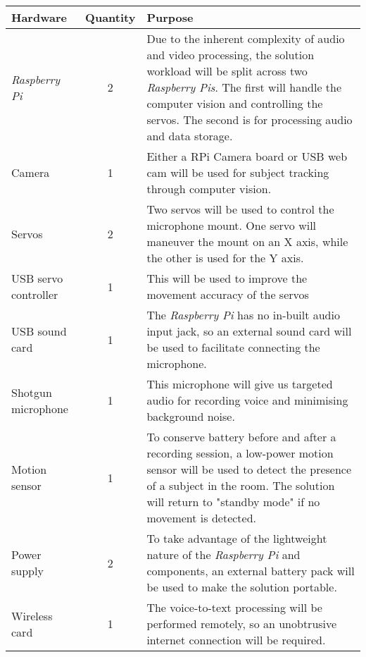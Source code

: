 \documentclass[11pt,a4paper,titlepage]{report}
\newcommand{\rpi}{\textit{Raspberry Pi\textsuperscript{\textregistered}}}
\newcommand{\rpis}{\textit{Raspberry Pi\textsuperscript{\textregistered}s}}
\begin{document}
\begin{center}
\begin{tabular}{ |l|c|p{6cm}| }
    \hline
    
    Hardware & Quantity & Purpose \\ \hline
    
    \rpi & 2 & Due to the inherent complexity of audio and video processing, the solution workload will be split across two \rpis. The first will handle the computer vision and controlling the servos. The second is for processing audio and data storage.\\ \hline

    Camera & 1 & Either a RPi Camera board or USB web cam will be used for subject tracking through computer vision. \\ \hline
    
    Servos & 2 & Two servos will be used to control the microphone mount. One servo will maneuver the mount on an X axis, while the other is used for the Y axis. \\ \hline
        
    USB servo controller & 1 & This will be used to improve the movement accuracy of the servos \\ \hline
    
    USB sound card & 1 & The \rpi\xspace has no in-built audio input jack, so an external sound card will be used to facilitate connecting the microphone. \\ \hline
    
    
    Shotgun microphone & 1 & This microphone will give us targeted audio for recording voice and minimising background noise. \\ \hline
    
    
    Motion sensor & 1 & To conserve battery before and after a recording session, a low-power motion sensor will be used to detect the presence of a subject in the room. The solution will return to "standby mode" if no movement is detected.\\ \hline

    Power supply & 2 & To take advantage of the lightweight nature of the \rpi\xspace and components, an external battery pack will be used to make the solution portable.\\ \hline


    Wireless card & 1 & The voice-to-text processing will be performed remotely, so an unobtrusive internet connection will be required.\\ \hline
    
\end{tabular}
\end{center}
\end{document}
